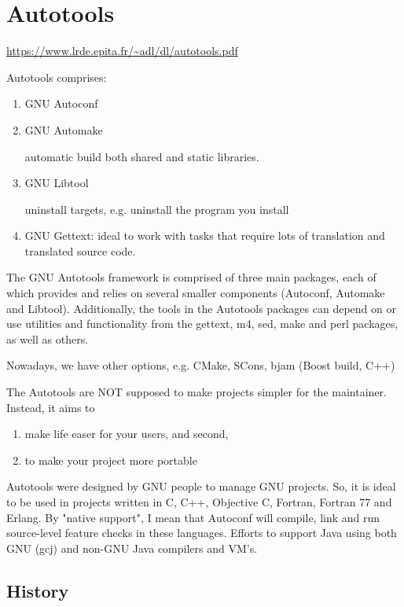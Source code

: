 \chapter{Autotools}

\url{https://www.lrde.epita.fr/~adl/dl/autotools.pdf}


Autotools comprises:
\begin{enumerate}
  \item GNU Autoconf
  
  \item GNU Automake

automatic build both shared and static libraries. 
  
  \item GNU Libtool

uninstall targets, e.g. uninstall the program you install
  
  \item GNU Gettext: ideal to work with tasks that require lots of translation
  and translated source code.  
\end{enumerate}
The GNU Autotools framework is comprised of three main packages, each of which
provides and relies on several smaller components (Autoconf, Automake and
Libtool). Additionally, the tools in the Autotools packages can depend on or use
utilities and functionality from the gettext, m4, sed, make and perl packages,
as well as others. 

Nowadays, we have other options, e.g. CMake, SCons, bjam (Boost build, C++)


The Autotools are NOT supposed to make projects simpler for the maintainer.
Instead, it aims to
\begin{enumerate}
  \item  make life easer for your users, and second, 
  
  \item to make your project more  portable
\end{enumerate}

Autotools were designed by GNU people to manage GNU projects.
So, it is ideal to be used in projects written in C, C++, Objective C, Fortran,
Fortran 77 and Erlang.
By "native support", I mean that Autoconf will compile, link and run
source-level feature checks in these languages.
Efforts to support Java using  both GNU (gcj) and non-GNU
Java compilers and VM's.


\section{History}

